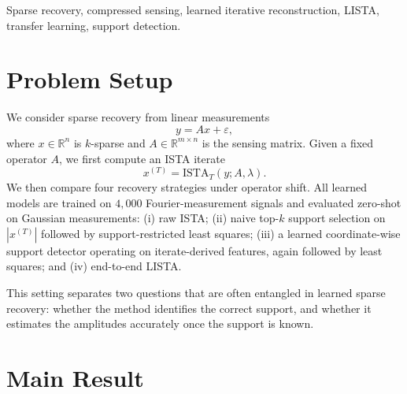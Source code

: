 \documentclass[conference,10pt]{IEEEtran}
\begin{document}
\begin{IEEEkeywords}
Sparse recovery, compressed sensing, learned iterative reconstruction,
LISTA, transfer learning, support detection.
\end{IEEEkeywords}

\section{Problem Setup}

We consider sparse recovery from linear measurements
\begin{equation}
    y = A x + \varepsilon,
\end{equation}
where $x \in \mathbb{R}^{n}$ is $k$-sparse and
$A \in \mathbb{R}^{m \times n}$ is the sensing matrix. Given a fixed
operator $A$, we first compute an ISTA iterate
\begin{equation}
    x^{(T)} = \mathrm{ISTA}_{T}(y; A, \lambda).
\end{equation}
We then compare four recovery strategies under operator shift. All
learned models are trained on $4{,}000$ Fourier-measurement signals and
evaluated zero-shot on Gaussian measurements: (i) raw ISTA; (ii) naive
top-$k$ support selection on $|x^{(T)}|$ followed by support-restricted
least squares; (iii) a learned coordinate-wise support detector operating
on iterate-derived features, again followed by least squares; and
(iv) end-to-end LISTA.

This setting separates two questions that are often entangled in learned
sparse recovery: whether the method identifies the correct support, and
whether it estimates the amplitudes accurately once the support is known.

\section{Main Result}
\end{document}
